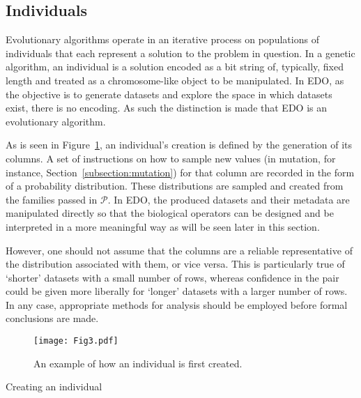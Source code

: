 \documentclass[11pt]{article}
\newlength{\imgwidth}
\newcommand{\balg}[1][htbp]{%
    \begin{algorithm}[#1]\DontPrintSemicolon
}
\newcommand{\ealg}{%
    \end{algorithm}
}
\begin{document}
\subsection{Individuals}

Evolutionary algorithms operate in an iterative process on populations of
individuals that each represent a solution to the problem in question. In a
genetic algorithm, an individual is a solution encoded as a bit string of,
typically, fixed length and treated as a chromosome-like object to be
manipulated. In EDO, as the objective is to generate datasets and explore the
space in which datasets exist, there is no encoding. As such the distinction is
made that EDO is an evolutionary algorithm. 

As is seen in Figure~\ref{fig:individual}, an individual's creation is
defined by the generation of its columns. A set of instructions on how to sample
new values (in mutation, for instance, Section~\ref{subsection:mutation}) for
that column are recorded in the form of a probability distribution. These
distributions are sampled and created from the families passed in
\(\mathcal{P}\). In EDO, the produced datasets and their metadata are
manipulated directly so that the biological operators can be designed and be
interpreted in a more meaningful way as will be seen later in this section.

However, one should not assume that the columns are a reliable representative of
the distribution associated with them, or vice versa. This is particularly true
of `shorter' datasets with a small number of rows, whereas confidence in the
pair could be given more liberally for `longer' datasets with a larger number
of rows. In any case, appropriate methods for analysis should be employed before
formal conclusions are made.

\begin{figure}[htbp]
    \centering
    \texttt{[image: Fig3.pdf]}
    \caption{%
        An example of how an individual is first created.
    }\label{fig:individual}
\end{figure}

\balg%

\caption{Creating an individual}
\ealg%
\end{document}
